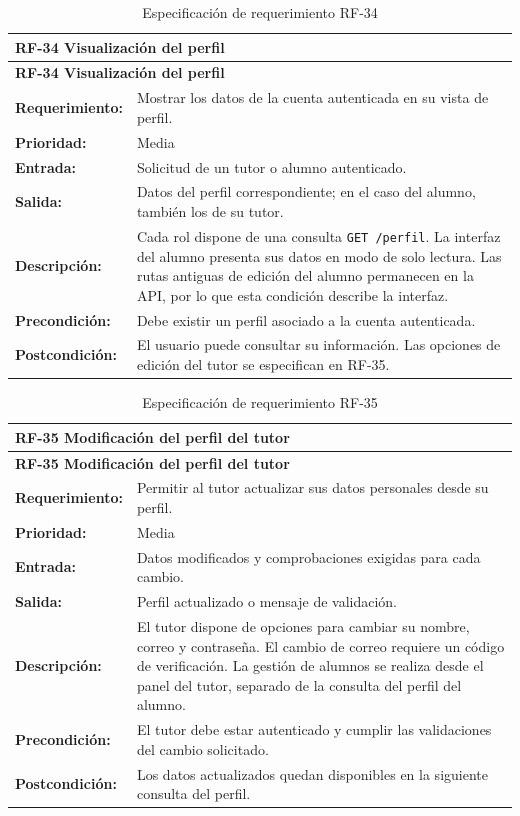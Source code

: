 \begin{longtable}{|p{3.2cm}|p{11.8cm}|}
\caption{Especificación de requerimiento RF-34}\label{tab:rf34} \\ \hline
\multicolumn{2}{|p{15cm}|}{\textbf{RF-34 Visualización del perfil}} \\ \hline
\endfirsthead
\hline
\multicolumn{2}{|p{15cm}|}{\textbf{RF-34 Visualización del perfil}} \\ \hline
\endhead
\textbf{Requerimiento:} & Mostrar los datos de la cuenta autenticada en su vista de perfil. \\ \hline
\textbf{Prioridad:} & Media \\ \hline
\textbf{Entrada:} & Solicitud de un tutor o alumno autenticado. \\ \hline
\textbf{Salida:} & Datos del perfil correspondiente; en el caso del alumno, también los de su tutor. \\ \hline
\textbf{Descripción:} & Cada rol dispone de una consulta \texttt{GET /perfil}. La interfaz del alumno presenta sus datos en modo de solo lectura. Las rutas antiguas de edición del alumno permanecen en la API, por lo que esta condición describe la interfaz. \\ \hline
\textbf{Precondición:} & Debe existir un perfil asociado a la cuenta autenticada. \\ \hline
\textbf{Postcondición:} & El usuario puede consultar su información. Las opciones de edición del tutor se especifican en RF-35. \\ \hline
\end{longtable}

\begin{longtable}{|p{3.2cm}|p{11.8cm}|}
\caption{Especificación de requerimiento RF-35}\label{tab:rf35} \\ \hline
\multicolumn{2}{|p{15cm}|}{\textbf{RF-35 Modificación del perfil del tutor}} \\ \hline
\endfirsthead
\hline
\multicolumn{2}{|p{15cm}|}{\textbf{RF-35 Modificación del perfil del tutor}} \\ \hline
\endhead
\textbf{Requerimiento:} & Permitir al tutor actualizar sus datos personales desde su perfil. \\ \hline
\textbf{Prioridad:} & Media \\ \hline
\textbf{Entrada:} & Datos modificados y comprobaciones exigidas para cada cambio. \\ \hline
\textbf{Salida:} & Perfil actualizado o mensaje de validación. \\ \hline
\textbf{Descripción:} & El tutor dispone de opciones para cambiar su nombre, correo y contraseña. El cambio de correo requiere un código de verificación. La gestión de alumnos se realiza desde el panel del tutor, separado de la consulta del perfil del alumno. \\ \hline
\textbf{Precondición:} & El tutor debe estar autenticado y cumplir las validaciones del cambio solicitado. \\ \hline
\textbf{Postcondición:} & Los datos actualizados quedan disponibles en la siguiente consulta del perfil. \\ \hline
\end{longtable}

